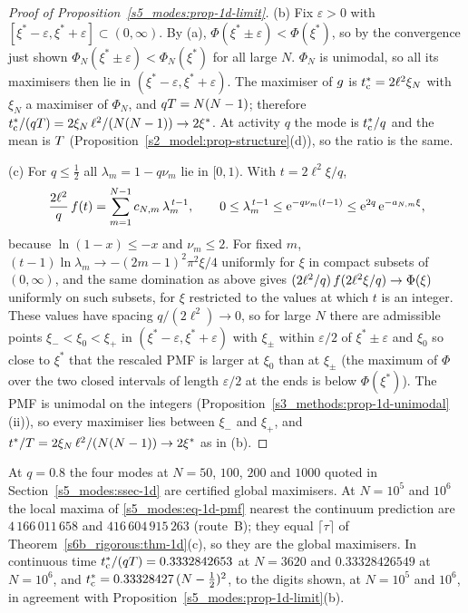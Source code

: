 \begin{proof}[Proof of Proposition~\ref{s5_modes:prop-1d-limit}]
(b) Fix $\varepsilon>0$ with $[\xi^{*}-\varepsilon,\xi^{*}+\varepsilon]\subset(0,\infty)$. By (a),
$\Phi(\xi^{*}\pm\varepsilon)<\Phi(\xi^{*})$, so by the convergence just shown
$\Phi_N(\xi^{*}\pm\varepsilon)<\Phi_N(\xi^{*})$ for all large $N$. $\Phi_N$ is unimodal, so all its maximisers
then lie in $(\xi^{*}-\varepsilon,\xi^{*}+\varepsilon)$. The maximiser of $g$ is $t^{*}_{\mathrm{c}}=2\ell^{2}\xi_N$ with
$\xi_N$ a maximiser of $\Phi_N$, and $qT=N(N-1)$; therefore $t^{*}_{\mathrm{c}}/(qT)=2\xi_N\,\ell^{2}/(N(N-1))\to2\xi^{*}$.
At activity $q$ the mode is $t^{*}_{\mathrm{c}}/q$ and the mean is $T$ (Proposition~\ref{s2_model:prop-structure}(d)), so
the ratio is the same.

(c) For $q\le\tfrac12$ all $\lambda_m=1-q\nu_m$ lie in $[0,1)$. With $t=2\ell^{2}\xi/q$,
\[
  \frac{2\ell^{2}}{q}\,f(t)=\sum_{m=1}^{N-1}c_{N,m}\,\lambda_m^{\,t-1},\qquad
  0\le\lambda_m^{\,t-1}\le\mathrm{e}^{-q\nu_m(t-1)}\le\mathrm{e}^{2q}\,\mathrm{e}^{-a_{N,m}\xi},
\]
because $\ln(1-x)\le-x$ and $\nu_m\le2$. For fixed $m$, $(t-1)\ln\lambda_m\to-(2m-1)^{2}\pi^{2}\xi/4$ uniformly for
$\xi$ in compact subsets of $(0,\infty)$, and the same domination as above gives
$(2\ell^{2}/q)\,f(2\ell^{2}\xi/q)\to\Phi(\xi)$ uniformly on such subsets, for $\xi$ restricted to the values at
which $t$ is an integer. These values have spacing $q/(2\ell^{2})\to0$, so for large $N$ there are admissible
points $\xi_-<\xi_0<\xi_+$ in $(\xi^{*}-\varepsilon,\xi^{*}+\varepsilon)$ with $\xi_\pm$ within
$\varepsilon/2$ of $\xi^{*}\pm\varepsilon$ and $\xi_0$ so close to $\xi^{*}$ that the rescaled PMF is larger at
$\xi_0$ than at $\xi_\pm$ (the maximum of $\Phi$ over the two closed intervals of length $\varepsilon/2$ at the
ends is below $\Phi(\xi^{*})$). The PMF is unimodal on the integers
(Proposition~\ref{s3_methods:prop-1d-unimodal}(ii)), so every maximiser lies between $\xi_-$ and $\xi_+$, and
$t^{*}/T=2\xi_N\,\ell^{2}/(N(N-1))\to2\xi^{*}$ as in (b).
\end{proof}

\begin{observation}\label{s5_modes:obs-1d}
At $q=0.8$ the four modes at $N=50$, $100$, $200$ and $1000$ quoted in Section~\ref{s5_modes:ssec-1d} are certified
global maximisers. At $N=10^{5}$ and $10^{6}$ the local maxima of \eqref{s5_modes:eq-1d-pmf} nearest the continuum
prediction are $4\,166\,011\,658$ and $416\,604\,915\,263$ (route~B); they equal $\lceil\tau\rceil$ of
Theorem~\ref{s6b_rigorous:thm-1d}(c), so they are the global maximisers.
In continuous time $t^{*}_{\mathrm{c}}/(qT)=0.3332842653$ at $N=3620$ and $0.33328426549$ at $N=10^{6}$, and
$t^{*}_{\mathrm{c}}=0.33328427\,(N-\tfrac12)^{2}$, to the digits shown, at $N=10^{5}$ and $10^{6}$, in agreement with
Proposition~\ref{s5_modes:prop-1d-limit}(b).
\end{observation}

